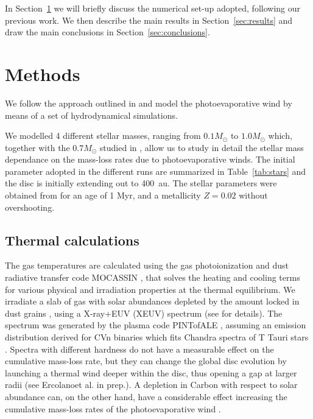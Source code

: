 \documentclass{aa}
\begin{document}
In Section~\ref{sec:methods} we will briefly discuss the numerical set-up adopted, following our previous work. We then describe the main results in Section~\ref{sec:results} and draw the main conclusions in Section~\ref{sec:conclusions}.

\section{Methods}\label{sec:methods}
We follow the approach outlined in  and model the photoevaporative wind by means of a set of hydrodynamical simulations.

We modelled 4 different stellar masses, ranging from $0.1 M_\odot$ to $1.0 M_\odot$ which, together with the $0.7 M_\odot$ studied in , allow us to study in detail the stellar mass dependance on the mass-loss rates due to photoevaporative winds.
The initial parameter adopted in the different runs are summarized in Table~\ref{tab:stars} and the disc is initially extending out to \SI{400}{au}.
The stellar parameters were obtained from  for an age of 1 Myr, and a metallicity $Z=0.02$ without overshooting.

\subsection{Thermal calculations}\label{sec:thermal-calc}
The gas temperatures are calculated using the gas photoionization and dust radiative transfer code \textsc{MOCASSIN} , that solves the heating and cooling terms for various physical and irradiation properties at the thermal equilibrium.
We irradiate a slab of gas with solar abundances  depleted by the amount locked in dust grains \citep{1996ApJ...470..893S}, using a X-ray+EUV (XEUV) spectrum (see  for details).
The spectrum was generated by the plasma code PINTofALE , assuming an emission distribution derived for CVn binaries  which fits Chandra spectra of T Tauri stars .
Spectra with different hardness do not have a measurable effect on the cumulative mass-loss rate, but they can change the global disc evolution by launching a thermal wind deeper within the disc, thus opening a gap at larger radii (see Ercolanoet al. in prep.).
A depletion in Carbon with respect to solar abundance can, on the other hand, have a considerable effect increasing the cumulative mass-loss rates of the photoevaporative wind .
\end{document}
